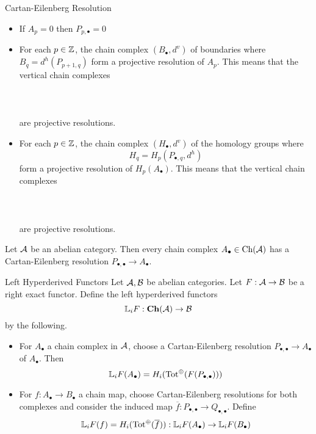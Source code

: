\documentclass[a4paper]{article}
\begin{document}
\begin{defn}{Cartan-Eilenberg Resolution}{}
\begin{itemize}
\item If $A_p=0$ then $P_{p,\bullet}=0$
\item For each $p\in\mathbb{Z}$, the chain complex $(B_\bullet,d^v)$ of boundaries where $B_q=d^h(P_{p+1,q})$ form a projective resolution of $A_p$. This means that the vertical chain complexes \\~\\
\\~\\
are projective resolutions. 
\item For each $p\in\mathbb{Z}$, the chain complex $(H_\bullet,d^v)$ of the homology groups where $$H_q=H_p(P_{\bullet,q},d^h)$$ form a projective resolution of $H_p(A_\bullet)$. This means that the vertical chain complexes \\~\\
\\~\\
are projective resolutions. 
\end{itemize}
\end{defn}

\begin{thm}{}{} Let $\mathcal{A}$ be an abelian category. Then every chain complex $A_\bullet\in\text{Ch}(\mathcal{A})$ has a Cartan-Eilenberg resolution $P_{\bullet,\bullet}\to A_\bullet$. 
\end{thm}

\begin{defn}{Left Hyperderived Functors}{} Let $\mathcal{A},\mathcal{B}$ be abelian categories. Let $F:\mathcal{A}\to\mathcal{B}$ be a right exact functor. Define the left hyperderived functors $$\mathbb{L}_i F:\bold{Ch}(\mathcal{A})\to\mathcal{B}$$ by the following. 
\begin{itemize}
\item For $A_\bullet$ a chain complex in $\mathcal{A}$, choose a Cartan-Eilenberg resolution $P_{\bullet,\bullet}\to A_\bullet$ of $A_\bullet$. Then $$\mathbb{L}_i F(A_\bullet)=H_i(\text{Tot}^\oplus(F(P_{\bullet,\bullet})))$$
\item For $f:A_\bullet\to B_\bullet$ a chain map, choose Cartan-Eilenberg resolutions for both complexes and consider the induced map $\overline{f}:P_{\bullet,\bullet}\to Q_{\bullet,\bullet}$. Define $$\mathbb{L}_i F(f)=H_i(\text{Tot}^\oplus(\overline{f})):\mathbb{L}_iF(A_\bullet)\to\mathbb{L}_iF(B_\bullet)$$
\end{itemize}
\end{defn}
\end{document}
